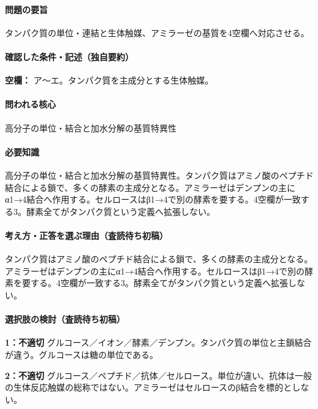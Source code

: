 \paragraph{問題の要旨} タンパク質の単位・連結と生体触媒、アミラーゼの基質を4空欄へ対応させる。

\paragraph{確認した条件・記述（独自要約）}\mbox{}\par

\noindent\textbf{空欄：} ア〜エ。タンパク質を主成分とする生体触媒。\par

\paragraph{問われる核心} 高分子の単位・結合と加水分解の基質特異性

\paragraph{必要知識} 高分子の単位・結合と加水分解の基質特異性。タンパク質はアミノ酸のペプチド結合による鎖で、多くの酵素の主成分となる。アミラーゼはデンプンの主にα1→4結合へ作用する。セルロースはβ1→4で別の酵素を要する。4空欄が一致する3。酵素全てがタンパク質という定義へ拡張しない。

\paragraph{考え方・正答を選ぶ理由（査読待ち初稿）} タンパク質はアミノ酸のペプチド結合による鎖で、多くの酵素の主成分となる。アミラーゼはデンプンの主にα1→4結合へ作用する。セルロースはβ1→4で別の酵素を要する。4空欄が一致する3。酵素全てがタンパク質という定義へ拡張しない。

\paragraph{選択肢の検討（査読待ち初稿）}\mbox{}\par

\noindent\textbf{1：不適切} グルコース／イオン／酵素／デンプン。タンパク質の単位と主鎖結合が違う。グルコースは糖の単位である。\par

\noindent\textbf{2：不適切} グルコース／ペプチド／抗体／セルロース。単位が違い、抗体は一般の生体反応触媒の総称ではない。アミラーゼはセルロースのβ結合を標的としない。\par


